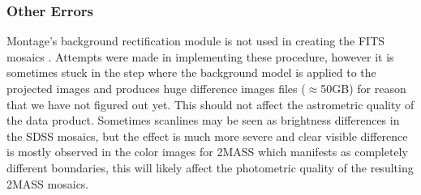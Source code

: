 \documentclass[5p]{elsarticle}
\begin{document}
	 	\subsubsection{Other Errors}
	 		Montage's background rectification module is not used in creating the FITS mosaics . Attempts were made in implementing these procedure, however it  is sometimes stuck in the step where the background model is applied to the projected images and  produces huge difference images files ($\approx$50GB) for reason that we have not figured out yet. This should not affect the astrometric quality of the data product. Sometimes scanlines may be seen as brightness differences in the SDSS mosaics, but the effect is much more severe and clear visible difference is  mostly  observed in the color images for 2MASS which manifests as completely different boundaries, this  will likely affect the photometric quality of the resulting 2MASS mosaics.
\end{document}
